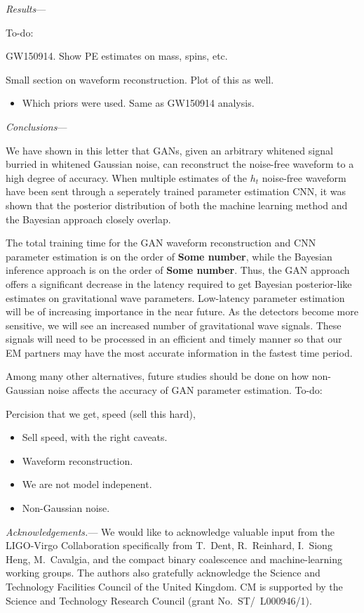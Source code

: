 \documentclass[%
showpacs,
 amsmath,amssymb,
 aps,
 twocolumn,
 prl,
 reprint,
floatfix,
]{revtex4-1}
\begin{document}
\textit{Results}---


To-do:

GW150914. Show PE estimates on mass, spins, etc.

Small section on waveform reconstruction. Plot of this as well.  

\begin{itemize}
\item Which priors were used. Same as GW150914 analysis.
\end{itemize}
\textit{Conclusions}---

We have shown in this letter that GANs, given an arbitrary whitened signal burried in whitened Gaussian noise, can reconstruct the noise-free waveform to a high degree of accuracy. When multiple estimates of the $h_t$ noise-free waveform have been sent through a seperately trained parameter estimation CNN, it was shown that the posterior distribution of both the machine learning method and the Bayesian approach closely overlap.

The total training time for the GAN waveform reconstruction and CNN parameter estimation is on the order of \textbf{Some number}, while the Bayesian inference approach is on the order of \textbf{Some number}. Thus, the GAN approach offers a significant decrease in the latency required to get Bayesian posterior-like estimates on gravitational wave parameters. Low-latency parameter estimation will be of increasing importance in the near future. As the detectors become more sensitive, we will see an increased number of gravitational wave signals. These signals will need to be processed in an efficient and timely manner so that our EM partners may have the most accurate information in the fastest time period.   

Among many other alternatives, future studies should be done on how non-Gaussian noise affects the accuracy of GAN parameter estimation. 
To-do:

Percision that we get, speed (sell this hard), 

\begin{itemize}
\item Sell speed, with the right caveats.
\item Waveform reconstruction.
\item We are not model indepenent.
\item Non-Gaussian noise.
\end{itemize}

%
%
\emph{Acknowledgements.}---
%
We would like to acknowledge valuable input from the LIGO-Virgo Collaboration
specifically from T.~Dent, R.~Reinhard, I.~Siong Heng, M.~Cavalgia, and the compact binary coalescence and
machine-learning working groups. The authors also gratefully acknowledge the
Science and Technology Facilities Council of the United Kingdom. CM is
supported by the Science and Technology Research Council (grant
No.~ST/~L000946/1).
%
\end{document}
